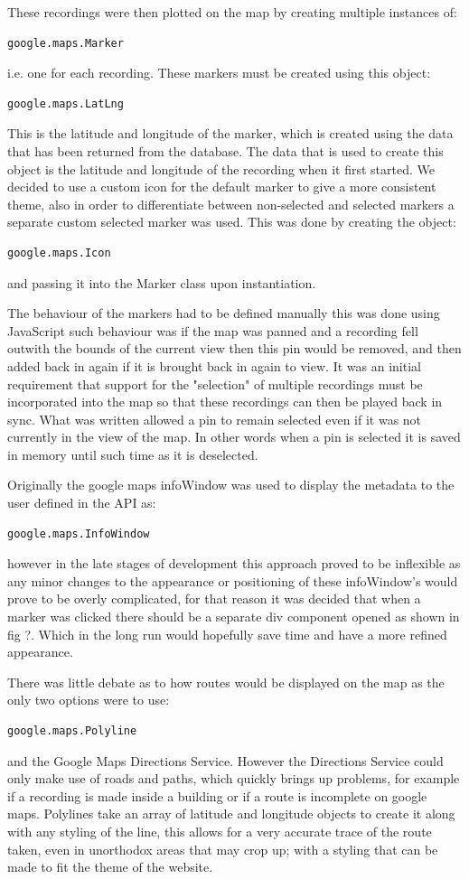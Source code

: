 \documentclass{l3proj}
\begin{document}
These recordings were then plotted on the map by creating multiple
instances of:
\begin{verbatim}
google.maps.Marker
\end{verbatim}
i.e. one for each recording. These markers must be created using this
object:
\begin{verbatim}
google.maps.LatLng
\end{verbatim}
This is the latitude and longitude of the marker, which is created
using the data that has been returned from the database. The data that
is used to create this object is the latitude and longitude of the
recording when it first started. 
We decided to use a custom icon for the default marker to give a more
consistent theme, also in order to differentiate between non-selected
and selected markers a separate custom selected marker was used. This
was done by creating the object:
\begin{verbatim}
google.maps.Icon
\end{verbatim}
and passing it into the Marker class upon instantiation.

The behaviour of the markers had to be defined manually this was done
using JavaScript such behaviour was if the map was panned and a
recording fell outwith the bounds of the current view then this pin
would be removed, and then added back in again if it is brought back
in again to view. It was an initial requirement that support for the
"selection" of multiple recordings must be incorporated into the map
so that these recordings can then be played back in sync. What was
written allowed a pin to remain selected even if it was not currently
in the view of the map. In other words when a pin is selected it is
saved in memory until such time as it is deselected.

Originally the google maps infoWindow was used to display the metadata
to the user defined in the API as: 
\begin{verbatim}
google.maps.InfoWindow
\end{verbatim}
however in the late stages of development this approach proved to be
inflexible as any minor changes to the appearance or positioning of
these infoWindow’s would prove to be overly complicated, for that
reason it was decided that when a marker was clicked there should be a
separate div component opened as shown in fig ?. Which in the long run
would hopefully save time and have a more refined appearance.

There was little debate as to how routes would be displayed on the map
as the only two options were to use:
\begin{verbatim}
google.maps.Polyline
\end{verbatim}
and the Google Maps Directions Service. However the Directions Service
could only make use of roads and paths, which quickly brings up
problems, for example if a recording is made inside a building or if a
route is incomplete on google maps. Polylines take an array of
latitude and longitude objects to create it along with any styling of
the line, this allows for a very accurate trace of the route taken,
even in unorthodox areas that may crop up; with a styling that can be
made to fit the theme of the website.
\end{document}
